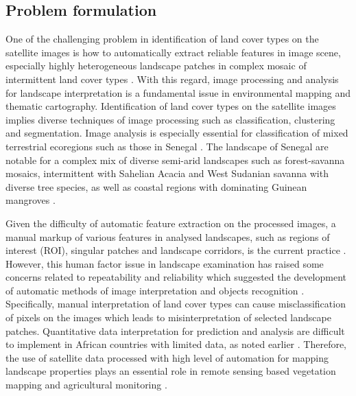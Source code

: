 \documentclass[earth,article,submit,pdftex,moreauthors]{Definitions/mdpi}
\begin{document}
\subsection{Problem formulation}

One of the challenging problem in identification of land cover types on the satellite images is how to automatically extract reliable features in image scene, especially highly heterogeneous landscape patches in complex mosaic of intermittent land cover types \cite{CAMPOS2018211,SYIFA2020919}. With this regard, image processing and analysis for landscape interpretation is a fundamental issue in environmental mapping and thematic cartography. Identification of land cover types on the satellite images implies diverse techniques of image processing such as classification, clustering and segmentation. Image analysis is especially essential for classification of mixed terrestrial ecoregions such as those in Senegal \cite{BUDDE2004481}. The landscape of Senegal are notable for a complex mix of diverse semi-arid landscapes such as forest-savanna mosaics, intermittent with Sahelian Acacia and West Sudanian savanna with diverse tree species, as well as coastal regions with dominating Guinean mangroves \cite{TAPPAN2004427,DEANS2003253}.

Given the difficulty of automatic feature extraction on the processed images, a manual markup of various features in analysed landscapes, such as regions of interest (ROI), singular patches and landscape corridors, is the current practice \cite{CABRAL2017115}. However, this human factor issue in landscape examination has raised some concerns related to repeatability and reliability which suggested the development of automatic methods of image interpretation and objects recognition \cite{CONCHEDDA2008578,rs9020181,rs12091436}. Specifically, manual interpretation of land cover types can cause misclassification of pixels on the images which leads to misinterpretation of selected landscape patches. Quantitative data interpretation for prediction and analysis are difficult to implement in African countries with limited data, as noted earlier \cite{STOORVOGEL2009161}. Therefore, the use of satellite data processed with high level of automation for mapping landscape properties plays an essential role in remote sensing based vegetation mapping and agricultural monitoring \cite{PEREZHOYOS2020102064,BRANDT2016215}.  
\end{document}
